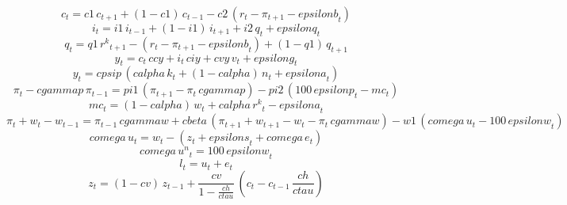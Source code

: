 \begin{dmath}
{{c}}_{t}={c1}\, {{c}}_{t+1}+\left(1-{c1}\right)\, {{c}}_{t-1}-{c2}\, \left({{r}}_{t}-{{\pi}}_{t+1}-{epsilonb}_{t}\right)
\end{dmath}
\begin{dmath}
{{i}}_{t}={i1}\, {{i}}_{t-1}+\left(1-{i1}\right)\, {{i}}_{t+1}+{i2}\, {{q}}_{t}+{epsilonq}_{t}
\end{dmath}
\begin{dmath}
{{q}}_{t}={q1}\, {{r^{k}}}_{t+1}-\left({{r}}_{t}-{{\pi}}_{t+1}-{epsilonb}_{t}\right)+\left(1-{q1}\right)\, {{q}}_{t+1}
\end{dmath}
\begin{dmath}
{{y}}_{t}={{c}}_{t}\, {ccy}+{{i}}_{t}\, {ciy}+{cvy}\, {{v}}_{t}+{epsilong}_{t}
\end{dmath}
\begin{dmath}
{{y}}_{t}={cpsip}\, \left({calpha}\, {{k}}_{t}+\left(1-{calpha}\right)\, {{n}}_{t}+{epsilona}_{t}\right)
\end{dmath}
\begin{dmath}
{{\pi}}_{t}-{cgammap}\, {{\pi}}_{t-1}={pi1}\, \left({{\pi}}_{t+1}-{{\pi}}_{t}\, {cgammap}\right)-{pi2}\, \left(100\, {epsilonp}_{t}-{{mc}}_{t}\right)
\end{dmath}
\begin{dmath}
{{mc}}_{t}=\left(1-{calpha}\right)\, {{w}}_{t}+{calpha}\, {{r^{k}}}_{t}-{epsilona}_{t}
\end{dmath}
\begin{dmath}
{{\pi}}_{t}+{{w}}_{t}-{{w}}_{t-1}={{\pi}}_{t-1}\, {cgammaw}+{cbeta}\, \left({{\pi}}_{t+1}+{{w}}_{t+1}-{{w}}_{t}-{{\pi}}_{t}\, {cgammaw}\right)-{w1}\, \left({comega}\, {{u}}_{t}-100\, {epsilonw}_{t}\right)
\end{dmath}
\begin{dmath}
{comega}\, {{u}}_{t}={{w}}_{t}-\left({{z}}_{t}+{epsilons}_{t}+{comega}\, {{e}}_{t}\right)
\end{dmath}
\begin{dmath}
{comega}\, {{u^{n}}}_{t}=100\, {epsilonw}_{t}
\end{dmath}
\begin{dmath}
{{l}}_{t}={{u}}_{t}+{{e}}_{t}
\end{dmath}
\begin{dmath}
{{z}}_{t}=\left(1-{cv}\right)\, {{z}}_{t-1}+\frac{{cv}}{1-\frac{{ch}}{{ctau}}}\, \left({{c}}_{t}-{{c}}_{t-1}\, \frac{{ch}}{{ctau}}\right)
\end{dmath}
